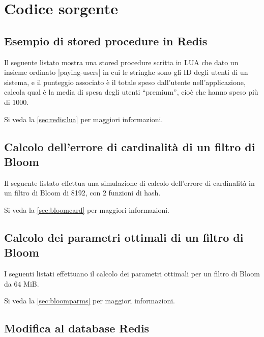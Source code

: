 \chapter{Codice sorgente}

\section{Esempio di stored procedure in Redis}

Il seguente listato mostra una stored procedure scritta in LUA che dato un insieme ordinato
\cverb|paying-users| in cui le stringhe sono gli ID degli utenti di un sistema, e il punteggio
associato è il totale speso dall'utente nell'applicazione, calcola qual è la media di spesa degli
utenti ``premium'', cioè che hanno speso più di \SI{1000}{\EUR}.

Si veda la \autoref{sec:redis:lua} per maggiori informazioni.



\section{Calcolo dell'errore di cardinalità di un filtro di Bloom}

Il seguente listato effettua una simulazione di calcolo dell'errore di cardinalità in un filtro
di Bloom di \SI{8192}{\bit}, con $2$ funzioni di hash.

Si veda la \autoref{sec:bloomcard} per maggiori informazioni.



\section{Calcolo dei parametri ottimali di un filtro di Bloom}

I seguenti listati effettuano il calcolo dei parametri ottimali per un filtro di Bloom da 64 MiB.

Si veda la \autoref{sec:bloomparms} per maggiori informazioni.



\section{Modifica al database Redis}
\label{sec:modredis}

